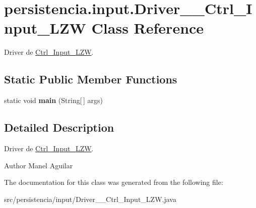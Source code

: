 \hypertarget{classpersistencia_1_1input_1_1Driver____Ctrl__Input__LZW}{}\section{persistencia.\+input.\+Driver\+\_\+\+\_\+\+Ctrl\+\_\+\+Input\+\_\+\+L\+ZW Class Reference}
\label{classpersistencia_1_1input_1_1Driver____Ctrl__Input__LZW}


Driver de \hyperlink{classpersistencia_1_1input_1_1Ctrl__Input__LZW}{Ctrl\+\_\+\+Input\+\_\+\+L\+ZW}.  


\subsection*{Static Public Member Functions}
\begin{DoxyCompactItemize}
\item 
\mbox{\label{classpersistencia_1_1input_1_1Driver____Ctrl__Input__LZW_a157252ceaf7ec257685654b5ad78049f}} 
static void {\bfseries main} (String\mbox{[}$\,$\mbox{]} args)
\end{DoxyCompactItemize}


\subsection{Detailed Description}
Driver de \hyperlink{classpersistencia_1_1input_1_1Ctrl__Input__LZW}{Ctrl\+\_\+\+Input\+\_\+\+L\+ZW}. 

\begin{DoxyAuthor}{Author}
Manel Aguilar 
\end{DoxyAuthor}


The documentation for this class was generated from the following file\+:\begin{DoxyCompactItemize}
\item 
src/persistencia/input/Driver\+\_\+\+\_\+\+Ctrl\+\_\+\+Input\+\_\+\+L\+Z\+W.\+java\end{DoxyCompactItemize}
